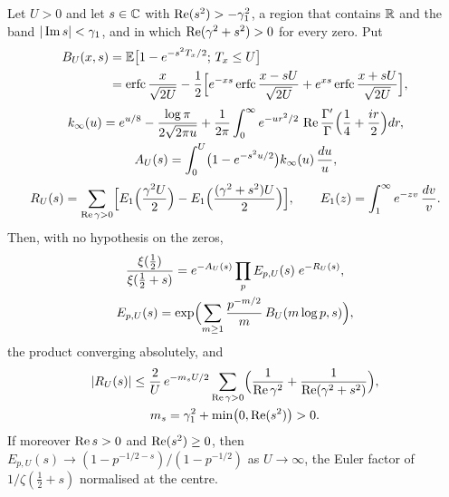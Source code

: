 \begin{theorem}\label{ht:thm:euler}
Let $U>0$ and let $s\in\mathbb{C}$ with $\operatorname{Re}(s^2)>-\gamma_1^2$, a region that contains $\mathbb{R}$ and the band $|\operatorname{Im} s|<\gamma_1$, and in which $\operatorname{Re}(\gamma^2+s^2)>0$ for every zero. Put
\[
\begin{split}B_U(x,s)&=\mathbb{E}\bigl[1-e^{-s^2T_x/2};\,T_x\le U\bigr]\\&=\operatorname{erfc}\frac{x}{\sqrt{2U}}-\frac12\Bigl[e^{-xs}\operatorname{erfc}\frac{x-sU}{\sqrt{2U}}+e^{xs}\operatorname{erfc}\frac{x+sU}{\sqrt{2U}}\Bigr],\end{split}
\]
\[
\begin{gathered}k_\infty(u)=e^{u/8}-\frac{\log\pi}{2\sqrt{2\pi u}}+\frac1{2\pi}\int_0^\infty e^{-ur^2/2}\,\operatorname{Re}\frac{\Gamma'}{\Gamma}\Bigl(\frac14+\frac{ir}2\Bigr)dr,\\A_U(s)=\int_0^U\bigl(1-e^{-s^2u/2}\bigr)k_\infty(u)\,\frac{du}u,\end{gathered}
\]
\[
R_U(s)=\sum_{\operatorname{Re}\gamma>0}\Bigl[E_1\Bigl(\frac{\gamma^2U}2\Bigr)-E_1\Bigl(\frac{(\gamma^2+s^2)U}2\Bigr)\Bigr],\qquad E_1(z)=\int_1^\infty e^{-zv}\,\frac{dv}v .
\]
Then, with no hypothesis on the zeros,
\[
\begin{gathered}\frac{\xi(\frac12)}{\xi(\frac12+s)}=e^{-A_U(s)}\prod_pE_{p,U}(s)\;e^{-R_U(s)},\\E_{p,U}(s)=\exp\Bigl(\sum_{m\ge1}\frac{p^{-m/2}}m\,B_U(m\log p,s)\Bigr),\end{gathered}
\]
the product converging absolutely, and
\[
\begin{gathered}|R_U(s)|\le\frac2U\,e^{-m_sU/2}\sum_{\operatorname{Re}\gamma>0}\Bigl(\frac1{\operatorname{Re}\gamma^2}+\frac1{\operatorname{Re}(\gamma^2+s^2)}\Bigr),\\m_s=\gamma_1^2+\min\bigl(0,\operatorname{Re}(s^2)\bigr)>0 .\end{gathered}
\]
If moreover $\operatorname{Re} s>0$ and $\operatorname{Re}(s^2)\ge0$, then $E_{p,U}(s)\to(1-p^{-1/2-s})/(1-p^{-1/2})$ as $U\to\infty$, the Euler factor of $1/\zeta(\frac12+s)$ normalised at the centre.
\end{theorem}

